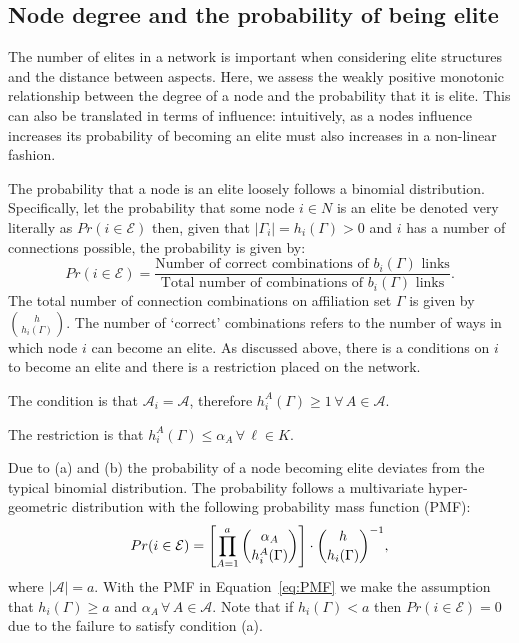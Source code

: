 \begin{subappendices}

\section[Degree and probabilistic eliteness]{Node degree and the probability of being elite} \label{AppA}

The number of elites in a network is important when considering elite structures and the distance between aspects. Here, we assess the weakly positive monotonic relationship between the degree of a node and the probability that it is elite. This can also be translated in terms of influence: intuitively, as a nodes influence increases its probability of becoming an elite must also increases in a non-linear fashion.

The probability that a node is an elite loosely follows a binomial distribution. Specifically, let the probability that some node $i \in N$ is an elite be denoted very literally as $Pr(i \in \mathcal{E})$ then, given that $| \Gamma_{i} | = h_{i}(\Gamma) > 0$ and $i$ has a number of connections possible, the probability is given by:
\[
Pr(i \in \mathcal{E}) = \frac{\mbox{Number of correct combinations of $b_{i}(\Gamma)$ links}}{\mbox{Total number of combinations of $b_{i}(\Gamma)$ links}}.
\]
The total number of connection combinations on affiliation set $\Gamma$ is given by $\binom{h}{h_{i}(\Gamma)}$. The number of `correct' combinations refers to the number of ways in which node $i$ can become an elite. As discussed above, there is a conditions on $i$ to become an elite and there is a restriction placed on the network.

\begin{abet}
\item The condition is that $\mathcal{A}_{i} = \mathcal{A}$, therefore $h^{A}_{i}(\Gamma) \geqslant 1 \, \forall \, A \in \mathcal{A}$.

\item The restriction is that $h^{A}_{i}(\Gamma) \leqslant \alpha_{A} \, \forall \, \ell \in K$.
\end{abet}
Due to (a) and (b) the probability of a node becoming elite deviates from the typical binomial distribution. The probability follows a multivariate hyper-geometric distribution with the following probability mass function (PMF):
\begin{equation} \label{eq:PMF}
Pr(i \in \mathcal{E}) =  \left[ \prod_{A = 1}^{a} \dbinom{\alpha_{A}}{h^{A}_{i}(\Gamma)} \right] \cdot \dbinom{h}{h_{i}(\Gamma)}^{-1},
\end{equation}
where $| \mathcal{A} | = a$. With the PMF in Equation~\ref{eq:PMF} we make the assumption that $h_{i}(\Gamma) \geqslant a$ and $\alpha_{A} \, \forall \, A \in \mathcal{A}$. Note that if $h_{i}(\Gamma) < a$ then $Pr(i \in \mathcal{E}) = 0$ due to the failure to satisfy condition (a).


\end{subappendices}
